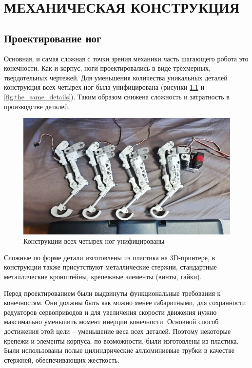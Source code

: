 \chapter{\MakeUppercase{Механическая конструкция}}
\section{Проектирование ног} \label{sec:leg_design}
Основная, и самая сложная с точки зрения механики часть шагающего робота это конечности. Как и корпус, ноги проектировались в виде трёхмерных, твердотельных чертежей. Для уменьшения количества уникальных деталей конструкция всех четырех ног была унифицирована (рисунки \ref{fig:the_same_legs} и \ref{fig:the_same_details}). Таким образом снижена сложность и затратность в производстве деталей. 

\begin{figure}[h]
    \centering
    \includegraphics[width=\textwidth]{chapter_mechanics_construction/figure11.jpg}
    \caption{Конструкции всех четырех ног унифицированы}
    \label{fig:the_same_legs}
\end{figure}

Сложные по форме детали изготовлены из пластика на 3D-принтере, в конструкции также присутствуют металлические стержни, стандартные металлические кронштейны, крепежные элементы (винты, гайки).

Перед проектированием были выдвинуты функциональные требования к конечностям. Они должны быть как можно менее габаритными, для сохранности редукторов сервоприводов и для увеличения скорости движения нужно максимально уменьшить момент инерции конечности. Основной способ достижения этой цели -- уменьшение веса всех деталей. Поэтому некоторые крепежи и элементы корпуса, по возможности, были изготовлены из пластика. Были использованы полые цилиндрические аллюминиевые трубки в качестве стержней, обеспечивающих жесткость.

